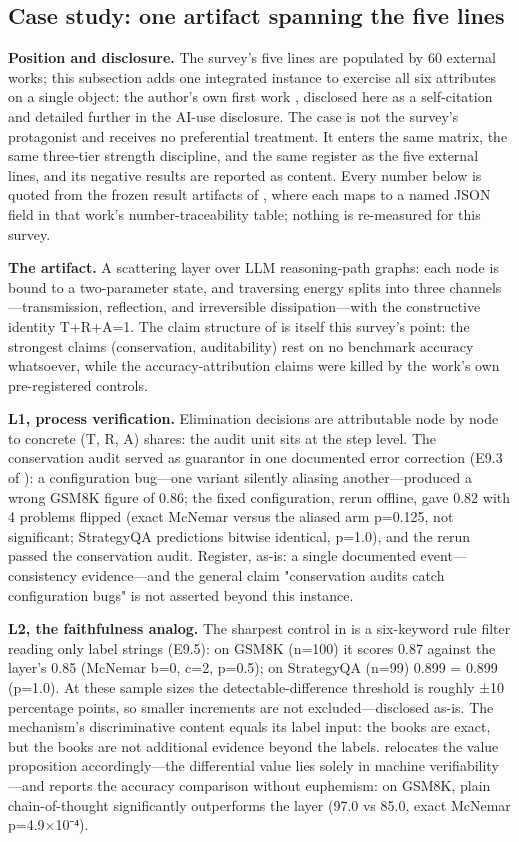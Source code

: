 \documentclass[11pt,a4paper]{article}
\begin{document}
\subsection{Case study: one artifact spanning the five lines}

\textbf{Position and disclosure.} The survey's five lines are populated by 60 external works; this subsection adds one integrated instance to exercise all six attributes on a single object: the author's own first work \cite{key04}, disclosed here as a self-citation and detailed further in the AI-use disclosure. The case is not the survey's protagonist and receives no preferential treatment. It enters the same matrix, the same three-tier strength discipline, and the same register as the five external lines, and its negative results are reported as content. Every number below is quoted from the frozen result artifacts of \cite{key04}, where each maps to a named JSON field in that work's number-traceability table; nothing is re-measured for this survey.

\textbf{The artifact.} A scattering layer over LLM reasoning-path graphs: each node is bound to a two-parameter state, and traversing energy splits into three channels—transmission, reflection, and irreversible dissipation—with the constructive identity T+R+A=1. The claim structure of \cite{key04} is itself this survey's point: the strongest claims (conservation, auditability) rest on no benchmark accuracy whatsoever, while the accuracy-attribution claims were killed by the work's own pre-registered controls.

\textbf{L1, process verification.} Elimination decisions are attributable node by node to concrete (T, R, A) shares: the audit unit sits at the step level. The conservation audit served as guarantor in one documented error correction (E9.3 of \cite{key04}): a configuration bug—one variant silently aliasing another—produced a wrong GSM8K figure of 0.86; the fixed configuration, rerun offline, gave 0.82 with 4 problems flipped (exact McNemar versus the aliased arm p=0.125, not significant; StrategyQA predictions bitwise identical, p=1.0), and the rerun passed the conservation audit. Register, as-is: a single documented event—consistency evidence—and the general claim "conservation audits catch configuration bugs" is not asserted beyond this instance.

\textbf{L2, the faithfulness analog.} The sharpest control in \cite{key04} is a six-keyword rule filter reading only label strings (E9.5): on GSM8K (n=100) it scores 0.87 against the layer's 0.85 (McNemar b=0, c=2, p=0.5); on StrategyQA (n=99) 0.899 = 0.899 (p=1.0). At these sample sizes the detectable-difference threshold is roughly ±10 percentage points, so smaller increments are not excluded—disclosed as-is. The mechanism's discriminative content equals its label input: the books are exact, but the books are not additional evidence beyond the labels. \cite{key04} relocates the value proposition accordingly—the differential value lies solely in machine verifiability—and reports the accuracy comparison without euphemism: on GSM8K, plain chain-of-thought significantly outperforms the layer (97.0 vs 85.0, exact McNemar p=4.9×10⁻⁴).
\end{document}
